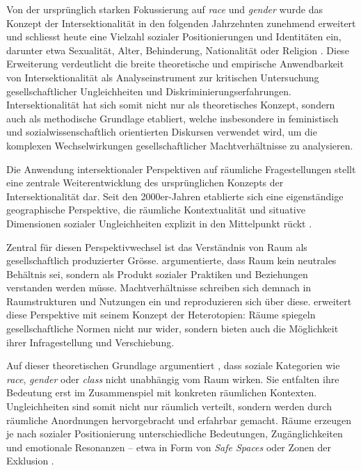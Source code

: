 Von der ursprünglich starken Fokussierung auf \textit{race} und \textit{gender} wurde das Konzept der Intersektionalität in den folgenden Jahrzehnten zunehmend erweitert und schliesst heute eine Vielzahl sozialer Positionierungen und Identitäten ein, darunter etwa Sexualität, Alter, Behinderung, Nationalität oder Religion \parencite{bauerIntersectionalityQuantitativeResearch2021, bowlegInvitedReflectionQuantifying2016}. Diese Erweiterung verdeutlicht die breite theoretische und empirische Anwendbarkeit von Intersektionalität als Analyseinstrument zur kritischen Untersuchung gesellschaftlicher Ungleichheiten und Diskriminierungserfahrungen. Intersektionalität hat sich somit nicht nur als theoretisches Konzept, sondern auch als methodische Grundlage etabliert, welche insbesondere in feministisch und sozialwissenschaftlich orientierten Diskursen verwendet wird, um die komplexen Wechselwirkungen gesellschaftlicher Machtverhältnisse zu analysieren.

\vspace{2em}

Die Anwendung intersektionaler Perspektiven auf räumliche Fragestellungen stellt eine zentrale Weiterentwicklung des ursprünglichen Konzepts der Intersektionalität dar. Seit den 2000er-Jahren etablierte sich eine eigenständige geographische Perspektive, die räumliche Kontextualität und situative Dimensionen sozialer Ungleichheiten explizit in den Mittelpunkt rückt \parencite{valentineTheorizingResearchingIntersectionality2007, rodo-de-zarateIntersectionalityFeministGeographies2018}.

Zentral für diesen Perspektivwechsel ist das Verständnis von Raum als gesellschaftlich produzierter Grösse. \textcite{lefebvreProductionLespace1974} argumentierte, dass Raum kein neutrales Behältnis sei, sondern als Produkt sozialer Praktiken und Beziehungen verstanden werden müsse. Machtverhältnisse schreiben sich demnach in Raumstrukturen und Nutzungen ein und reproduzieren sich über diese. \textcite{foucaultEspacesAutres2004} erweitert diese Perspektive mit seinem Konzept der Heterotopien: Räume spiegeln gesellschaftliche Normen nicht nur wider, sondern bieten auch die Möglichkeit ihrer Infragestellung und Verschiebung.

Auf dieser theoretischen Grundlage argumentiert \textcite{valentineTheorizingResearchingIntersectionality2007}, dass soziale Kategorien wie \textit{race}, \textit{gender} oder \textit{class} nicht unabhängig vom Raum wirken. Sie entfalten ihre Bedeutung erst im Zusammenspiel mit konkreten räumlichen Kontexten. Ungleichheiten sind somit nicht nur räumlich verteilt, sondern werden durch räumliche Anordnungen hervorgebracht und erfahrbar gemacht. Räume erzeugen je nach sozialer Positionierung unterschiedliche Bedeutungen, Zugänglichkeiten und emotionale Resonanzen -- etwa in Form von \textit{Safe Spaces} oder Zonen der Exklusion \parencite[\gls{vgl}][S.~548--549]{rodo-de-zarateIntersectionalityFeministGeographies2018}.

